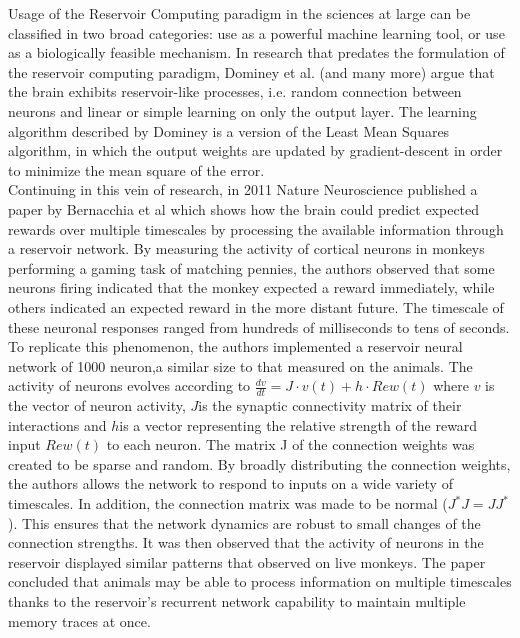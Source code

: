 \documentclass[12pt,oneside]{CUNY_CS_PhD}
\begin{document}
Usage of the Reservoir Computing paradigm in the sciences at large can be classified in two broad categories: use as a powerful machine learning tool, or use as a biologically feasible mechanism. 
\label{dominey}
In research that predates the formulation of the reservoir computing paradigm, Dominey  et al. \cite{Dominey95, dominey1995complex} (and many more) argue that the brain exhibits reservoir-like processes, i.e. random connection between neurons and linear or simple learning on only the output layer. The learning algorithm described by Dominey is a version of the Least Mean Squares algorithm, in which the output weights are updated by gradient-descent in order to minimize the mean square of the error.\\

Continuing in this vein of research, in 2011 Nature Neuroscience published a paper by Bernacchia et al \cite{bernacchia_reservoir_2011} which shows how the brain could predict expected rewards over multiple timescales by processing the available information through a reservoir network. By measuring the activity of cortical neurons in monkeys performing a gaming task of matching pennies, the authors observed that some neurons firing indicated that the monkey expected a reward immediately, while others indicated an expected reward in the more distant future. The timescale of these neuronal responses ranged from hundreds of milliseconds to tens of seconds. To replicate this phenomenon, the authors implemented a reservoir neural network of 1000 neuron,a similar size to that measured on the animals. The activity of neurons evolves according to $\frac{dv}{dt} = J \cdot v(t) + h \cdot Rew(t)$ where $v$ is the vector of neuron activity, $J$is the synaptic connectivity matrix of their interactions and $h$is a vector representing the relative strength of the reward input $Rew(t)$ to each neuron. The matrix J of the connection weights was created to be sparse and random. By broadly distributing the connection weights, the authors allows the network to respond to inputs on a wide variety of timescales. In addition, the connection matrix was made to be normal ($J^*J = JJ^*$). This ensures \cite{spectra} that the network dynamics are robust to small changes of the connection strengths. It was then observed that the activity of neurons in the reservoir displayed similar patterns that observed on live monkeys. The paper concluded that animals may be able to process information on multiple timescales thanks to the reservoir's recurrent network capability to maintain multiple memory traces at once.
\newpage
\end{document}
